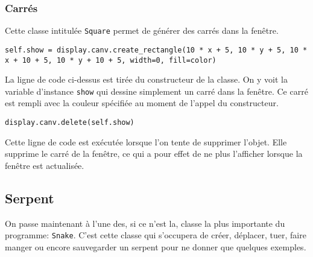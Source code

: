 \documentclass[12pt, a4paper, openany]{book}
\begin{document}
\subsubsection{Carrés}
\label{r:2.7.2-car}
Cette classe intitulée \verb'Square' permet de générer des carrés dans la fenêtre.
\begin{verbatim}
self.show = display.canv.create_rectangle(10 * x + 5, 10 * y + 5, 10 * x + 10 + 5, 10 * y + 10 + 5, width=0, fill=color)
\end{verbatim}
La ligne de code ci-dessus est tirée du constructeur de la classe. On y voit la variable d'instance \verb'show' qui dessine simplement un carré dans la fenêtre. Ce carré est rempli avec la couleur spécifiée au moment de l’appel du constructeur.\newline
\begin{verbatim}
display.canv.delete(self.show)
\end{verbatim}
Cette ligne de code est exécutée lorsque l'on tente de supprimer l'objet. Elle supprime le carré de la fenêtre, ce qui a pour effet de ne plus l'afficher lorsque la fenêtre est actualisée.

\subsection{Serpent}
On passe maintenant à l'une des, si ce n'est la, classe la plus importante du programme: \verb'Snake'. C'est cette classe qui s'occupera de créer, déplacer, tuer, faire manger ou encore sauvegarder un serpent pour ne donner que quelques exemples.
\end{document}
